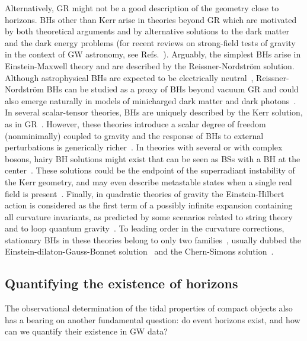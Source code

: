 \documentclass[aps,twocolumn,showpacs,preprintnumbers,nofootinbib,prd,superscriptaddress,groupedaddress,10pt]{revtex4-1}
\begin{document}
Alternatively, GR might not be a good description of the geometry close to horizons. BHs other than Kerr arise in theories beyond GR which are motivated by both theoretical arguments and by alternative solutions to the dark matter and the dark energy problems (for recent reviews on strong-field tests of gravity in the context of GW astronomy, see Refs.~\cite{Yunes:2013dva,Berti:2015itd}).
%
Arguably, the simplest BHs arise in Einstein-Maxwell theory and are described by the Reissner-Nordstr\"om solution. Although astrophysical BHs are expected to be electrically neutral~\cite{Barausse:2014tra}, Reissner-Nordstr\"om BHs can be studied as a proxy of BHs beyond vacuum GR and could also emerge naturally in models of minicharged dark matter and dark photons~\cite{Cardoso:2016olt}.
%
In several scalar-tensor theories, BHs are uniquely described by the Kerr solution, as in GR~\cite{hawking1972,Sotiriou:2011dz}. However, these theories introduce a scalar degree of freedom (nonminimally) coupled to gravity and the response of BHs to external perturbations is generically richer~\cite{Barausse:2008xv}. In theories with several or with complex bosons, hairy BH solutions might exist that can be seen as BSs with a BH at the center~\cite{Herdeiro:2014goa,Herdeiro:2016tmi}. These solutions could be the endpoint of the superradiant instability of the Kerr geometry, and may even describe metastable states when a single real field is present~\cite{Brito:2015oca,Brito:2014wla}.
%
Finally, in quadratic theories of gravity the Einstein-Hilbert action is considered as the first term of a possibly infinite expansion containing all curvature invariants, as predicted by some scenarios related to string theory and to loop quantum gravity~\cite{Berti:2015itd}. To leading order in the curvature corrections, stationary BHs in these theories belong to only two families~\cite{Yunes:2011we,Pani:2011gy}, usually dubbed the Einstein-dilaton-Gauss-Bonnet solution~\cite{Mignemi:1992nt,Kanti:1995vq,Pani:2009wy} and the Chern-Simons solution~\cite{Yunes:2009hc,Alexander:2009tp}.

\subsection{Quantifying the existence of horizons}
The observational determination of the tidal properties of compact objects also has a bearing on another fundamental question:
do event horizons exist, and how can we quantify their existence in GW data?
\end{document}
